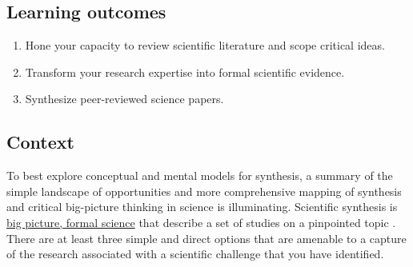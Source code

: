 \documentclass[
]{book}
\providecommand{\tightlist}{%
  \setlength{\itemsep}{0pt}\setlength{\parskip}{0pt}}
\begin{document}
\hypertarget{learning-outcomes-1}{%
\subsection*{Learning outcomes}\label{learning-outcomes-1}}

\begin{enumerate}
\def\labelenumi{\arabic{enumi}.}
\tightlist
\item
  Hone your capacity to review scientific literature and scope critical ideas.
\item
  Transform your research expertise into formal scientific evidence.\\
\item
  Synthesize peer-reviewed science papers.
\end{enumerate}

\hypertarget{context}{%
\subsection*{Context}\label{context}}

To best explore conceptual and mental models for synthesis, a summary of the simple landscape of opportunities and more comprehensive mapping of synthesis and critical big-picture thinking in science is illuminating. Scientific synthesis is \href{https://onlinelibrary.wiley.com/doi/full/10.1111/j.1600-0706.2013.00970.x}{big picture, formal science} that describe a set of studies on a pinpointed topic \citep{RN3216}. There are at least three simple and direct options that are amenable to a capture of the research associated with a scientific challenge that you have identified.
\end{document}
